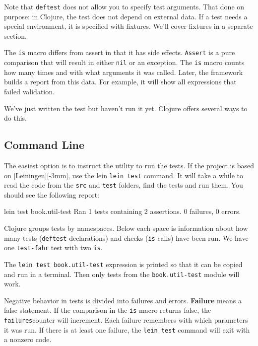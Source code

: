 Note that \verb|deftest| does not allow you to specify test arguments. That done on purpose: in Clojure, the test does not depend on external data. If a test needs a special environment, it is specified with fixtures. We'll cover fixtures in a separate section.

The \verb|is| macro differs from assert in that it has side effects. \verb|Assert| is a pure comparison that will result in either \verb|nil| or an exception. The \verb|is| macro counts how many times and with what arguments it was called. Later, the framework builds a report from this data. For example, it will show all expressions that failed validation.

We've just written the test but haven't run it yet. Clojure offers several ways to do this.

\subsection{Command Line}


The easiest option is to instruct the utility to run the tests. If the project is based on [Leiningen][-3mm], use the lein \verb|lein test| command. It will take a while to read the code from the \verb|src| and \verb|test| folders, find the tests and run them. You should see the following report:

\begin{english}
  \begin{text}
lein test book.util-test
Ran 1 tests containing 2 assertions.
0 failures, 0 errors.
  \end{text}
\end{english}

Clojure groups tests by namespaces. Below each space is information about how many tests (\verb|deftest| declarations) and checks (\verb|is| calls) have been run. We have one \verb|test-fahr| test with two \verb|is|.


The \verb|lein test book.util-test| expression is printed so that it can be copied and run in a terminal. Then only tests from the \verb|book.util-test| module will work.

Negative behavior in tests is divided into failures and errors. \textbf{Failure} means a false statement. If the comparison in the \verb|is| macro returns false, the \verb|failures|counter will increment. Each failure remembers with which parameters it was run. If there is at least one failure, the \verb|lein test| command will exit with a nonzero code.

